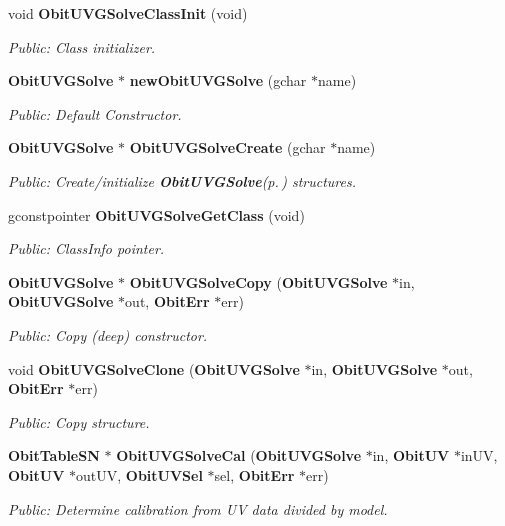 \begin{CompactItemize}
\item 
void {\bf Obit\-UVGSolve\-Class\-Init} (void)
\begin{CompactList}\small\item\em Public: Class initializer. \item\end{CompactList}\item 
{\bf Obit\-UVGSolve} $\ast$ {\bf new\-Obit\-UVGSolve} (gchar $\ast$name)
\begin{CompactList}\small\item\em Public: Default Constructor. \item\end{CompactList}\item 
{\bf Obit\-UVGSolve} $\ast$ {\bf Obit\-UVGSolve\-Create} (gchar $\ast$name)
\begin{CompactList}\small\item\em Public: Create/initialize {\bf Obit\-UVGSolve}{\rm (p.\,\pageref{structObitUVGSolve})} structures. \item\end{CompactList}\item 
gconstpointer {\bf Obit\-UVGSolve\-Get\-Class} (void)
\begin{CompactList}\small\item\em Public: Class\-Info pointer. \item\end{CompactList}\item 
{\bf Obit\-UVGSolve} $\ast$ {\bf Obit\-UVGSolve\-Copy} ({\bf Obit\-UVGSolve} $\ast$in, {\bf Obit\-UVGSolve} $\ast$out, {\bf Obit\-Err} $\ast$err)
\begin{CompactList}\small\item\em Public: Copy (deep) constructor. \item\end{CompactList}\item 
void {\bf Obit\-UVGSolve\-Clone} ({\bf Obit\-UVGSolve} $\ast$in, {\bf Obit\-UVGSolve} $\ast$out, {\bf Obit\-Err} $\ast$err)
\begin{CompactList}\small\item\em Public: Copy structure. \item\end{CompactList}\item 
{\bf Obit\-Table\-SN} $\ast$ {\bf Obit\-UVGSolve\-Cal} ({\bf Obit\-UVGSolve} $\ast$in, {\bf Obit\-UV} $\ast$in\-UV, {\bf Obit\-UV} $\ast$out\-UV, {\bf Obit\-UVSel} $\ast$sel, {\bf Obit\-Err} $\ast$err)
\begin{CompactList}\small\item\em Public: Determine calibration from UV data divided by model. \item\end{CompactList}\end{CompactItemize}


